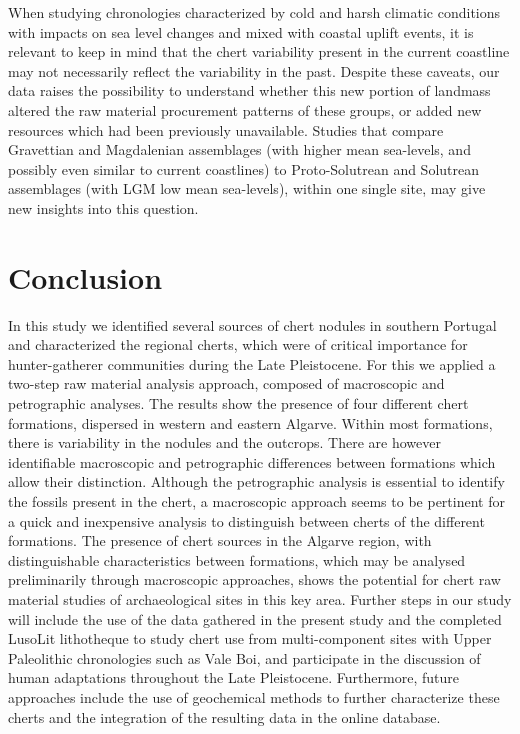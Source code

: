 \documentclass[
  a4paper,
  DIV=11,
  numbers=noendperiod]{scrreprt}
\begin{document}
When studying chronologies characterized by cold and harsh climatic
conditions with impacts on sea level changes and mixed with coastal
uplift events, it is relevant to keep in mind that the chert variability
present in the current coastline may not necessarily reflect the
variability in the past. Despite these caveats, our data raises the
possibility to understand whether this new portion of landmass altered
the raw material procurement patterns of these groups, or added new
resources which had been previously unavailable. Studies that compare
Gravettian and Magdalenian assemblages (with higher mean sea-levels, and
possibly even similar to current coastlines) to Proto-Solutrean and
Solutrean assemblages (with LGM low mean sea-levels), within one single
site, may give new insights into this question.

\section{Conclusion}\label{conclusion}

In this study we identified several sources of chert nodules in southern
Portugal and characterized the regional cherts, which were of critical
importance for hunter-gatherer communities during the Late Pleistocene.
For this we applied a two-step raw material analysis approach, composed
of macroscopic and petrographic analyses. The results show the presence
of four different chert formations, dispersed in western and eastern
Algarve. Within most formations, there is variability in the nodules and
the outcrops. There are however identifiable macroscopic and
petrographic differences between formations which allow their
distinction. Although the petrographic analysis is essential to identify
the fossils present in the chert, a macroscopic approach seems to be
pertinent for a quick and inexpensive analysis to distinguish between
cherts of the different formations. The presence of chert sources in the
Algarve region, with distinguishable characteristics between formations,
which may be analysed preliminarily through macroscopic approaches,
shows the potential for chert raw material studies of archaeological
sites in this key area. Further steps in our study will include the use
of the data gathered in the present study and the completed LusoLit
lithotheque to study chert use from multi-component sites with Upper
Paleolithic chronologies such as Vale Boi, and participate in the
discussion of human adaptations throughout the Late Pleistocene.
Furthermore, future approaches include the use of geochemical methods to
further characterize these cherts and the integration of the resulting
data in the online database.
\end{document}
